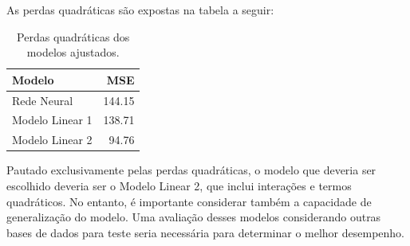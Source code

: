 \documentclass[
  a4paperpaper,
]{article}
\newenvironment{Shaded}{\begin{snugshade}}{\end{snugshade}}
\newcommand{\AttributeTok}[1]{\textcolor[rgb]{0.40,0.45,0.13}{#1}}
\newcommand{\DecValTok}[1]{\textcolor[rgb]{0.68,0.00,0.00}{#1}}
\newcommand{\FunctionTok}[1]{\textcolor[rgb]{0.28,0.35,0.67}{#1}}
\newcommand{\NormalTok}[1]{\textcolor[rgb]{0.00,0.23,0.31}{#1}}
\newcommand{\OtherTok}[1]{\textcolor[rgb]{0.00,0.23,0.31}{#1}}
\newcommand{\SpecialCharTok}[1]{\textcolor[rgb]{0.37,0.37,0.37}{#1}}
\newcommand{\StringTok}[1]{\textcolor[rgb]{0.13,0.47,0.30}{#1}}
\begin{document}
\begin{Shaded}
\end{Shaded}

As perdas quadráticas são expostas na tabela a seguir:

\begin{longtable}[]{@{}lr@{}}

\caption{\label{tbl-MSE}Perdas quadráticas dos modelos ajustados.}

\tabularnewline

\toprule\noalign{}
Modelo & MSE \\
\midrule\noalign{}
\endhead
\bottomrule\noalign{}
\endlastfoot
Rede Neural & 144.15 \\
Modelo Linear 1 & 138.71 \\
Modelo Linear 2 & 94.76 \\

\end{longtable}

Pautado exclusivamente pelas perdas quadráticas, o modelo que deveria
ser escolhido deveria ser o Modelo Linear 2, que inclui interações e
termos quadráticos. No entanto, é importante considerar também a
capacidade de generalização do modelo. Uma avaliação desses modelos
considerando outras bases de dados para teste seria necessária para
determinar o melhor desempenho.
\end{document}
